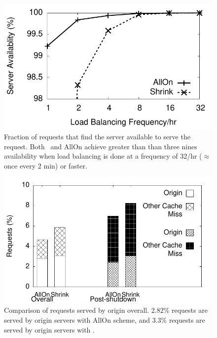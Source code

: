 \begin{figure}[tbp]
\includegraphics[scale=0.55]{energy/graphs/real/g3_availability/availability.pdf}
\caption{Fraction of requests that find the server available to serve the request. Both \shrink\ and AllOn achieve greater than than three nines availability when load balancing is done at a frequency of 32/hr ($\approx$ once every 2 min) or faster.}
\end{figure}


\begin{figure}[tbp]
\includegraphics[scale=0.55]{energy/graphs/real/g4_originrequests/origin-2.pdf}
\caption{Comparison of requests served by origin overall. 2.82\% requests are served by origin servers with AllOn scheme, and 3.3\% requests are served by origin servers with \shrink.}
\end{figure}


